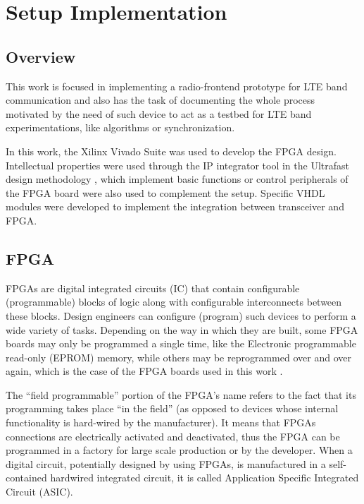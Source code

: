 \chapter{Setup Implementation}
\label{chap:implementation}

\section{Overview}

This work is focused in implementing a radio-frontend prototype for LTE band
communication and also has the task of documenting the whole process motivated
by the need of such device to act as a testbed for LTE band experimentations,
like algorithms or synchronization.

In this work, the Xilinx Vivado Suite was used to develop the FPGA design.
Intellectual properties were used through the IP integrator tool in the
Ultrafast design methodology \cite{xilinx:ultrafast}, which implement basic
functions or control peripherals of the FPGA board were also used to complement
the setup. Specific VHDL modules were developed to implement the integration
between transceiver and FPGA.

\section{FPGA}

FPGAs are digital integrated circuits (IC) that contain configurable
(programmable) blocks of logic along with configurable interconnects between
these blocks. Design engineers can configure (program) such devices to perform a
wide variety of tasks. Depending on the way in which they are built, some FPGA
boards may only be programmed a single time, like the Electronic programmable
read-only (EPROM) memory, while others may be reprogrammed over and over again,
which is the case of the FPGA boards used in this work \cite{max2004}.

The “field programmable” portion of the FPGA’s name refers to the fact that its
programming takes place “in the field” (as opposed to devices whose internal
functionality is hard-wired by the manufacturer). It means that FPGAs
connections are electrically activated and deactivated, thus the FPGA can be
programmed in a factory for large scale production or by the developer. When a
digital circuit, potentially designed by using FPGAs, is manufactured in a
self-contained hardwired integrated circuit, it is called Application Specific
Integrated Circuit (ASIC).

